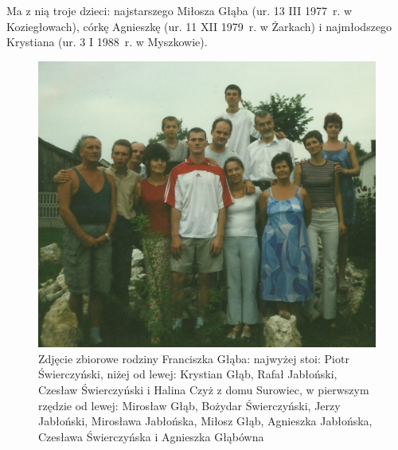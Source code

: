 Ma z nią troje dzieci: najstarszego Miłosza Głąba (ur. 13 III 1977~r. w Koziegłowach), córkę Agnieszkę (ur. 11 XII 1979~r. w Żarkach) i najmłodszego Krystiana (ur. 3 I 1988~r. w Myszkowie).

\begin{figure}[!h]
\begin{center}
\includegraphics[width=\textwidth]{zdjecia/rodzina_franciszka_glaba.jpg}
\caption[Zdjęcie zbiorowe rodziny Franciszka Głąba]{Zdjęcie zbiorowe rodziny Franciszka Głąba: najwyżej stoi: Piotr Świerczyński, niżej od lewej: Krystian Głąb, Rafał Jabłoński, Czesław Świerczyński i Halina Czyż z domu Surowiec, w pierwszym rzędzie od lewej: Mirosław Głąb, Bożydar Świerczyński, Jerzy Jabłoński, Mirosława Jabłońska, Miłosz Głąb, Agnieszka Jabłońska, Czesława Świerczyńska i Agnieszka Głąbówna}
\label{rys:rodzina_franciszka_glaba}
\end{center}
\end{figure}